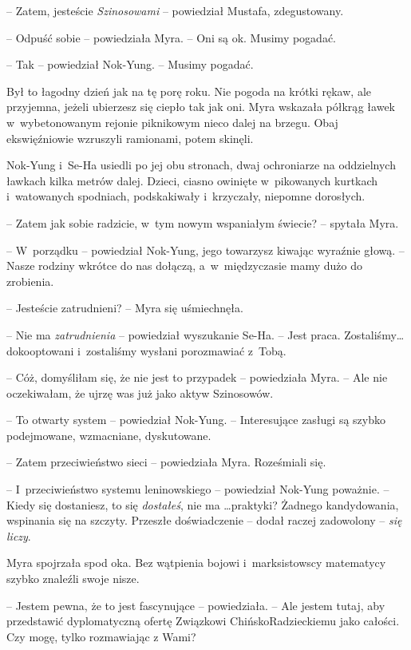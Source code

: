 \documentclass[oneside,polish,11pt,sfheadings]{mwbk}
\begin{document}
-- Zatem, jesteście \textit{Szinosowami} -- powiedział Mustafa,
zdegustowany.

-- Odpuść sobie -- powiedziała Myra. -- Oni są ok. Musimy pogadać.

-- Tak -- powiedział Nok-Yung. -- Musimy pogadać.

Był to łagodny dzień jak na tę porę roku. Nie pogoda na krótki rękaw,
ale przyjemna, jeżeli ubierzesz się ciepło tak jak oni. Myra wskazała
półkrąg ławek w~wybetonowanym rejonie piknikowym nieco dalej na brzegu.
Obaj ekswięźniowie wzruszyli ramionami, potem skinęli.

Nok-Yung i~Se-Ha usiedli po jej obu stronach, dwaj ochroniarze na
oddzielnych ławkach kilka metrów dalej. Dzieci, ciasno owinięte w~pikowanych kurtkach i~watowanych spodniach, podskakiwały i~krzyczały,
niepomne dorosłych.

-- Zatem jak sobie radzicie, w~tym nowym wspaniałym świecie? -- spytała
Myra.

-- W~porządku -- powiedział Nok-Yung, jego towarzysz kiwając wyraźnie
głową. -- Nasze rodziny wkrótce do nas dołączą, a~w~międzyczasie mamy
dużo do zrobienia.

-- Jesteście zatrudnieni? -- Myra się uśmiechnęła.

-- Nie ma \textit{zatrudnienia} -- powiedział wyszukanie Se-Ha. -- Jest
praca. Zostaliśmy\ldots dokooptowani i~zostaliśmy wysłani porozmawiać z~Tobą.

-- Cóż, domyśliłam się, że nie jest to przypadek -- powiedziała Myra. -- Ale nie oczekiwałam, że ujrzę was już jako aktyw Szinosowów.

-- To otwarty system -- powiedział Nok-Yung. -- Interesujące zasługi są
szybko podejmowane, wzmacniane, dyskutowane.

-- Zatem przeciwieństwo sieci -- powiedziała Myra. Roześmiali się.

-- I~przeciwieństwo systemu leninowskiego -- powiedział Nok-Yung poważnie.
-- Kiedy się dostaniesz, to się \textit{dostałeś}, nie ma \ldots praktyki?
Żadnego kandydowania, wspinania się na szczyty. Przeszłe doświadczenie -- dodał raczej zadowolony -- \textit{się liczy}.

Myra spojrzała spod oka. Bez wątpienia bojowi i~marksistowscy matematycy
szybko znaleźli swoje nisze. 

-- Jestem pewna, że to jest fascynujące -- powiedziała. -- Ale jestem tutaj, aby przedstawić dyplomatyczną ofertę
Związkowi Chińsko\dywiz Radzieckiemu jako całości. Czy mogę, tylko rozmawiając
z Wami?
\end{document}
